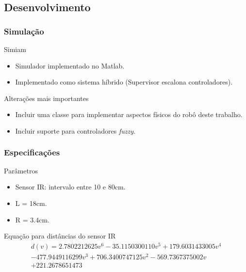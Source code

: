 \subsection{Desenvolvimento}

\begin{frame}
	\frametitle{Simulação}
	\begin{block}{Simiam}
		\begin{itemize}
		  \item Simulador implementado no Matlab.
		  \item Implementado como sistema híbrido (Supervisor escalona controladores).
		\end{itemize}
	\end{block}
	
	\vspace{-3.5cm}
	
\end{frame}
	
\begin{frame}
	\begin{exampleblock}{Alterações mais importantes}
		\begin{itemize}
		  \item Incluir uma classe para implementar aspectos físicos do robô deste
		  trabalho.
		  \item Incluir suporte para controladores \textit{fuzzy}.
		\end{itemize}
	\end{exampleblock}
\end{frame}

\begin{frame}
	\frametitle{Especificações}
	
		\begin{exampleblock}{Parâmetros}
			\begin{itemize}
			  \item Sensor IR: intervalo entre 10 e 80cm.
			  \item L = 18cm.
			  \item R = 3.4cm.
			\end{itemize}	
		\end{exampleblock}	
		\vspace{-3.2cm}
		\begin{exampleblock}{Equação para distâncias do sensor IR}
			\begin{equation}
				\begin{split}
					d(v) = 2.7802212625 v^6 -35.1150300110 v^5 + 179.6031433005 v^4 \\
					-477.9449116299 v^3 + 706.3400747125 v^2 -569.7367375002 v \\
					+ 221.2678651473
				\end{split}
			\end{equation}
		\end{exampleblock}
\end{frame}


